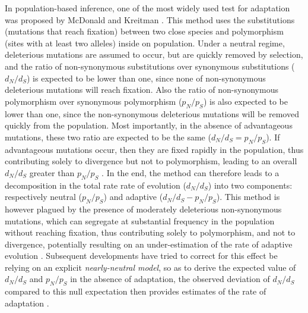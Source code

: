 \documentclass[10pt]{article}
\begin{document}
\begin{multicols}{2}
	In population-based inference, one of the most widely used test for adaptation was proposed by McDonald and Kreitman \cite{McDonald1991}. This method uses the substitutions (mutations that reach fixation) between two close species and polymorphism (sites with at least two alleles) inside on population. Under a neutral regime, deleterious mutations are assumed to occur, but are quickly removed by selection, and the ratio of non-synonymous substitutions over synonymous substitutions ($d_N/d_S$) is expected to be lower than one, since none of non-synonymous deleterious mutations will reach fixation. Also the ratio of non-synonymous polymorphism over synonymous polymorphism ($p_N/p_S$) is also expected to be lower than one, since the non-synonymous deleterious mutations will be removed quickly from the population. Most importantly, in the absence of advantageous mutations, these two ratio are expected to be the same ($d_N/d_S=p_N/p_S$). If advantageous mutations occur, then they are fixed rapidly in the population, thus contributing solely to divergence but not to polymorphism, leading to an overall $d_N/d_S$ greater than $p_N/p_S$ \cite{smith_adaptive_2002, kimura_neutral_1983}. In the end, the method can therefore leads to a decomposition in the total rate rate of evolution ($d_N/d_S$) into two components: respectively neutral ($p_N/p_S$) and adaptive ($d_N/d_S-p_N/p_S$). This method is however plagued by the presence of moderately deleterious non-synonymous mutations, which can segregate at substantial frequency in the population without reaching fixation, thus contributing solely to polymorphism, and not to divergence, potentially resulting on an under-estimation of the rate of adaptive evolution \cite{eyre-walker_quantifying_2002}. Subsequent developments have tried to correct for this effect be relying on an explicit \textit{nearly-neutral model}, so as to derive the expected value of $d_N/d_S$ and $p_N/p_S$ in the absence of adaptation, the observed deviation of $d_N/d_S$ compared to this null expectation then provides estimates of the rate of adaptation \cite{eyre-walker_estimating_2009, galtier_adaptive_2016}.
	

\end{multicols}
\end{document}
